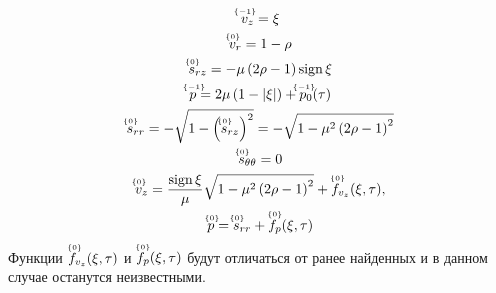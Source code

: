 \begin{subequations}
  \label{sol:ch2/sec6/sub1/main/int}
  \begin{gather}
    \label{sol:ch2/sec6/sub1/vz/-1}
    \uindex{v}{-1}_{z} = \xi
    \\
    \label{sol:ch2/sec6/sub1/vr/0}
    \uindex{v}{0}_{r} =  1 - \rho
    \\
    \label{sol:ch2/sec6/sub1/srz/0}
    \uindex{s}{0}_{rz} = -\mu \left(2\rho - 1\right) \sign \xi
    \\
    \label{sol:ch2/sec6/sub1/p/-1}
    \uindex{p}{-1} = 2\mu\left(1-\lvert\xi\rvert\right) + \uindex{p}{-1}_{0}(\tau)
    \\
    \label{sol:ch2/sec6/sub1/srr/0}
    \uindex{s}{0}_{rr} = -\sqrt{1-\left(\uindex{s}{0}_{rz}\right)^2} = -\sqrt{1-\mu^2\left(2\rho-1\right)^2}
    \\
    \label{sol:ch2/sec6/sub1/stt/0}
    \uindex{s}{0}_{\theta\theta} = 0
    \\
    \label{sol:ch2/sec6/sub1/vz/0}
    \uindex{v}{0}_{z} = \frac{\sign\xi}{\mu}\sqrt{1-\mu^2\left(2\rho-1\right)^2} + \uindex{f}{0}_{v_{z}}(\xi,\tau),
    \\
    \label{sol:ch2/sec6/sub1/p/0}
    \uindex{p}{0} = \uindex{s}{0}_{rr} +\uindex{f}{0}_{p}(\xi,\tau)
  \end{gather}
\end{subequations}
Функции $\uindex{f}{0}_{v_{z}}(\xi,\tau)$ и $\uindex{f}{0}_{p}(\xi,\tau)$ будут отличаться от ранее найденных и в данном случае останутся неизвестными.

